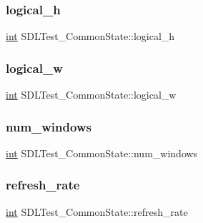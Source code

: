 \subsubsection{\texorpdfstring{logical\_h}{logical\_h}}
{\footnotesize\ttfamily \mbox{\hyperlink{warnings_8h_a74f207b5aa4ba51c3a2ad59b219a423b}{int}} S\+D\+L\+Test\+\_\+\+Common\+State\+::logical\+\_\+h}

\mbox{\label{struct_s_d_l_test___common_state_a8a90266f8d6dc7846fbd3368426caec1}} 
\subsubsection{\texorpdfstring{logical\_w}{logical\_w}}
{\footnotesize\ttfamily \mbox{\hyperlink{warnings_8h_a74f207b5aa4ba51c3a2ad59b219a423b}{int}} S\+D\+L\+Test\+\_\+\+Common\+State\+::logical\+\_\+w}

\mbox{\label{struct_s_d_l_test___common_state_a4f8020400392b1ae374c066b45a56538}} 
\subsubsection{\texorpdfstring{num\_windows}{num\_windows}}
{\footnotesize\ttfamily \mbox{\hyperlink{warnings_8h_a74f207b5aa4ba51c3a2ad59b219a423b}{int}} S\+D\+L\+Test\+\_\+\+Common\+State\+::num\+\_\+windows}

\mbox{\label{struct_s_d_l_test___common_state_a7a2505f4f99be07db7bc76743ac6b5f9}} 
\subsubsection{\texorpdfstring{refresh\_rate}{refresh\_rate}}
{\footnotesize\ttfamily \mbox{\hyperlink{warnings_8h_a74f207b5aa4ba51c3a2ad59b219a423b}{int}} S\+D\+L\+Test\+\_\+\+Common\+State\+::refresh\+\_\+rate}

